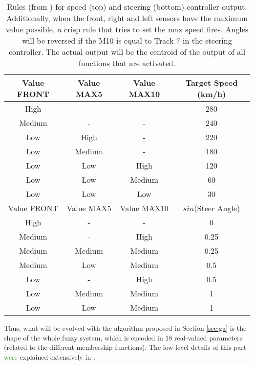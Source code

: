 \documentclass[10pt,journal,compsoc]{IEEEtran}
\begin{document}
\begin{table}[h!tb]
  \centering
  {\scriptsize
    \caption{Rules  (from \cite{salem_evo18}) for speed (top) and steering
      (bottom) controller output. Additionally, when 
      the front, right and left sensors have the maximum value
      possible, a crisp rule that tries to set the max speed
      fires.  Angles will be reversed
      if the M10 is equal to Track 7 in the steering controller. The
      actual output will be the centroid of the output of all functions
      that are activated. \label{tab:output}}
    \begin{tabular}{|c|c|c||c|}
\hline
      Value FRONT & Value MAX5 & Value MAX10 & Target Speed (km/h) \\
      \hline
      High & - & - & 280 \\
      Medium & - & - & 240 \\
      Low & High & - & 220 \\
      Low & Medium & - & 180 \\
      Low & Low & High & 120 \\
      Low & Low & Medium & 60 \\           
      Low & Low & Low & 30 \\     
\hline
\hline
      Value FRONT & Value MAX5 & Value MAX10 & $sin$(Steer Angle) \\
\hline
      High & - & - & 0 \\
      Medium & - & High & 0.25 \\
      Medium & Medium & Medium & 0.25 \\
      Medium & Low & Medium & 0.5 \\
      Low & - & High & 0.5 \\
      Low & Medium & Medium & 1 \\
      Low & Low & Medium & 1 \\ 
      
\hline
\end{tabular}
}
\end{table}



Thus, what will be evolved with the algorithm proposed in Section
\ref{sec:ga} is the shape of the whole fuzzy system, which is encoded
in 18 real-valued parameters (related to the different membership
functions). The low-level details of this part \textcolor{green}{were} explained
extensively in \cite{DBLP:conf/cig/SalemMG19}. 
\end{document}

